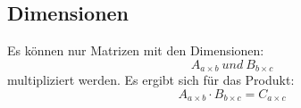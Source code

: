 \subsection{Dimensionen}
Es können nur Matrizen mit den Dimensionen:
\[
    A_{a\times b} \: und \: B_{b\times c}
\]
multipliziert werden. Es ergibt sich für das Produkt:
\[
    A_{a\times b} \cdot B_{b\times c} = C_{a\times c}
\]